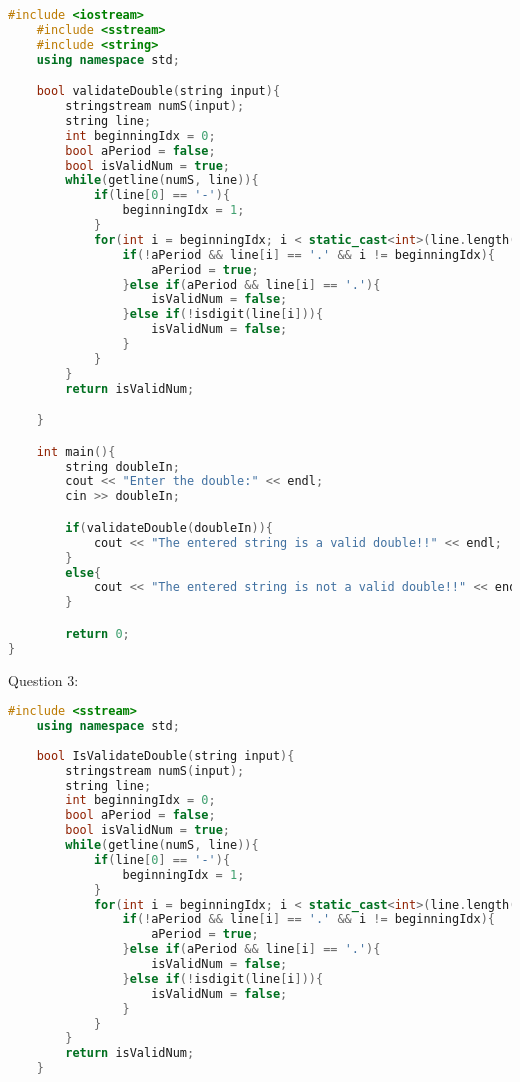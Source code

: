 \documentclass{article}
\begin{document}
\begin{lstlisting}[language=C++]
    #include <iostream>
    #include <sstream>
    #include <string>
    using namespace std;

    bool validateDouble(string input){
        stringstream numS(input);
        string line;
        int beginningIdx = 0;
        bool aPeriod = false;
        bool isValidNum = true;
        while(getline(numS, line)){
            if(line[0] == '-'){
                beginningIdx = 1;
            }
            for(int i = beginningIdx; i < static_cast<int>(line.length()); i++){
                if(!aPeriod && line[i] == '.' && i != beginningIdx){
                    aPeriod = true;
                }else if(aPeriod && line[i] == '.'){
                    isValidNum = false;
                }else if(!isdigit(line[i])){
                    isValidNum = false;
                }
            }
        }
        return isValidNum;

    }

    int main(){
        string doubleIn;
        cout << "Enter the double:" << endl;
        cin >> doubleIn;

        if(validateDouble(doubleIn)){
            cout << "The entered string is a valid double!!" << endl;
        }
        else{
            cout << "The entered string is not a valid double!!" << endl;
        }

        return 0;
}
\end{lstlisting}

\vspace{1cm}

Question 3:

\begin{lstlisting}[language=C++]
    #include <sstream>
    using namespace std;
    
    bool IsValidateDouble(string input){
        stringstream numS(input);
        string line;
        int beginningIdx = 0;
        bool aPeriod = false;
        bool isValidNum = true;
        while(getline(numS, line)){
            if(line[0] == '-'){
                beginningIdx = 1;
            }
            for(int i = beginningIdx; i < static_cast<int>(line.length()); i++){
                if(!aPeriod && line[i] == '.' && i != beginningIdx){
                    aPeriod = true;
                }else if(aPeriod && line[i] == '.'){
                    isValidNum = false;
                }else if(!isdigit(line[i])){
                    isValidNum = false;
                }
            }
        }
        return isValidNum;
    }
\end{lstlisting}
\end{document}
